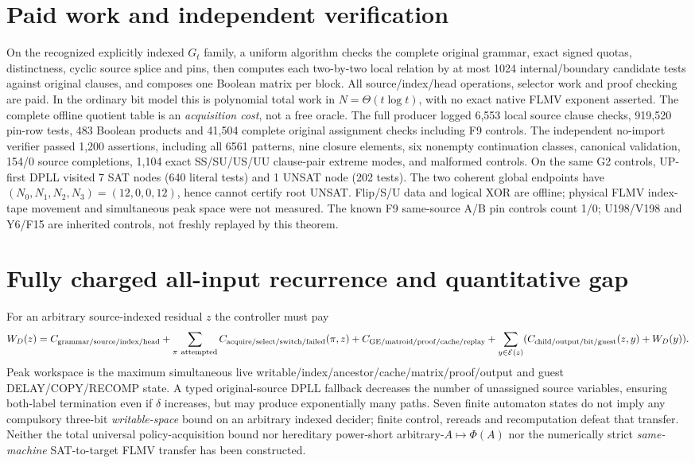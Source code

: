 \documentclass[11pt]{article}
\begin{document}
\section{Paid work and independent verification}
On the recognized explicitly indexed $G_t$ family, a uniform algorithm checks the complete original grammar, exact signed quotas, distinctness, cyclic source splice and pins, then computes each two-by-two local relation by at most 1024 internal/boundary candidate tests against original clauses, and composes one Boolean matrix per block. All source/index/head operations, selector work and proof checking are paid. In the ordinary bit model this is polynomial total work in $N=\Theta(t\log t)$, with no exact native FLMV exponent asserted. The complete offline quotient table is an \emph{acquisition cost}, not a free oracle.
The full producer logged 6,553 local source clause checks, 919,520 pin-row tests, 483 Boolean products and 41,504 complete original assignment checks including F9 controls. The independent no-import verifier passed 1,200 assertions, including all 6561 patterns, nine closure elements, six nonempty continuation classes, canonical validation, 154/0 source completions, 1,104 exact SS/SU/US/UU clause-pair extreme modes, and malformed controls. On the same G2 controls, UP-first DPLL visited 7 SAT nodes (640 literal tests) and 1 UNSAT node (202 tests). The two coherent global endpoints have $(N_0,N_1,N_2,N_3)=(12,0,0,12)$, hence cannot certify root UNSAT. Flip/S/U data and logical XOR are offline; physical FLMV index-tape movement and simultaneous peak space were not measured. The known F9 same-source A/B pin controls count 1/0; U198/V198 and Y6/F15 are inherited controls, not freshly replayed by this theorem.
\section{Fully charged all-input recurrence and quantitative gap}
For an arbitrary source-indexed residual $z$ the controller must pay
\[
W_D(z)=C_{\rm grammar/source/index/head}
+\sum_{\pi\ \rm attempted}C_{\rm acquire/select/switch/failed}(\pi,z)
+C_{\rm GE/matroid/proof/cache/replay}
+\sum_{y\in\mathcal E(z)}(C_{\rm child/output/bit/guest}(z,y)+W_D(y)).
\]
Peak workspace is the maximum simultaneous live writable/index/ancestor/cache/matrix/proof/output and guest DELAY/COPY/RECOMP state. A typed original-source DPLL fallback decreases the number of unassigned source variables, ensuring both-label termination even if $\delta$ increases, but may produce exponentially many paths. Seven finite automaton states do not imply any compulsory three-bit \emph{writable-space} bound on an arbitrary indexed decider; finite control, rereads and recomputation defeat that transfer. Neither the total universal policy-acquisition bound nor hereditary power-short arbitrary-$A\mapsto\Phi(A)$ nor the numerically strict \emph{same-machine} SAT-to-target FLMV transfer has been constructed.
\end{document}
